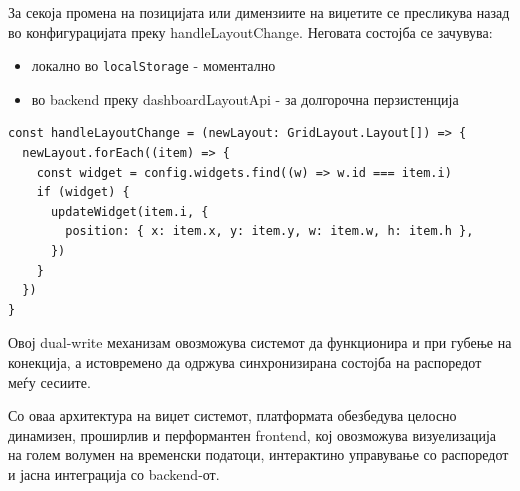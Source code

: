 За секоја промена на позицијата или димензиите на виџетите се пресликува назад во конфигурацијата преку handleLayoutChange. Неговата состојба се зачувува:
\begin{itemize}
    \item локално во \texttt{localStorage} - моментално
    \item во backend преку dashboardLayoutApi - за долгорочна перзистенција
\end{itemize}

\begin{verbatim}
const handleLayoutChange = (newLayout: GridLayout.Layout[]) => {
  newLayout.forEach((item) => {
    const widget = config.widgets.find((w) => w.id === item.i)
    if (widget) {
      updateWidget(item.i, {
        position: { x: item.x, y: item.y, w: item.w, h: item.h },
      })
    }
  })
}
\end{verbatim}

Овој dual-write механизам овозможува системот да функционира и при губење на конекција, а истовремено да одржува синхронизирана состојба на распоредот меѓу сесиите.

Со оваа архитектура на виџет системот, платформата обезбедува целосно динамизен, проширлив и перформантен frontend, кој овозможува визуелизација на голем волумен на временски податоци, интерактино управување со распоредот и јасна интеграција со backend-от.
